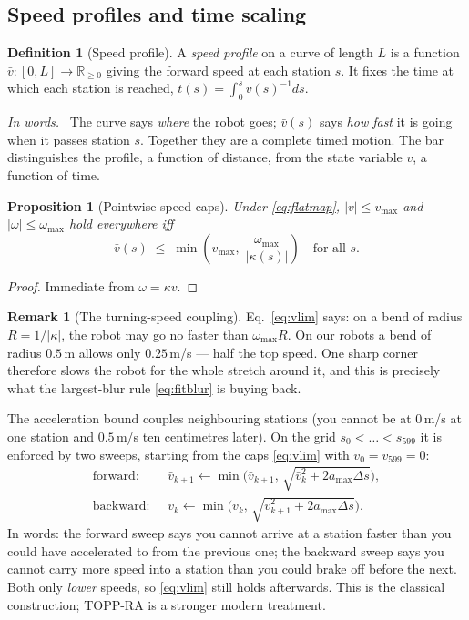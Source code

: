 \documentclass[conference]{IEEEtran}
\theoremstyle{plain}
\newtheorem{proposition}{Proposition}
\theoremstyle{definition}
\newtheorem{definition}{Definition}
\newtheorem{remark}{Remark}
\newcommand{\inwords}{\par\smallskip\noindent\textit{In words.}\ }
\newcommand{\R}{\mathbb{R}}
\begin{document}
\subsection{Speed profiles and time scaling}
\label{sec:prelim-topp}

\begin{definition}[Speed profile]
A \emph{speed profile} on a curve of length $L$ is a function $\bar v : [0,L] \to \R_{\ge 0}$
giving the forward speed at each station $s$. It fixes the time at which each station is
reached, $t(s) = \int_0^s \bar v(\bar s)^{-1} d\bar s$.
\inwords
The curve says \emph{where} the robot goes; $\bar v(s)$ says \emph{how fast} it is going when
it passes station $s$. Together they are a complete timed motion. The bar distinguishes the
profile, a function of distance, from the state variable $v$, a function of time.
\end{definition}

\begin{proposition}[Pointwise speed caps]
\label{prop:caps}
Under \eqref{eq:flatmap}, $|v| \le v_{\max}$ and $|\omega| \le \omega_{\max}$ hold everywhere
iff
\begin{equation}
  \bar v(s) \;\le\; \min\!\left( v_{\max},\; \frac{\omega_{\max}}{|\kappa(s)|} \right)
  \quad \text{for all } s .
  \label{eq:vlim}
\end{equation}
\end{proposition}

\begin{proof}
Immediate from $\omega = \kappa v$.
\end{proof}

\begin{remark}[The turning-speed coupling]
Eq.~\eqref{eq:vlim} says: on a bend of radius $R = 1/|\kappa|$, the robot may go no faster
than $\omega_{\max} R$. On our robots a bend of radius $0.5$\,m allows only $0.25$\,m/s ---
half the top speed. One sharp corner therefore slows the robot for the whole stretch around
it, and this is precisely what the largest-blur rule \eqref{eq:fitblur} is buying back.
\end{remark}

The acceleration bound couples neighbouring stations (you cannot be at $0$\,m/s at one
station and $0.5$\,m/s ten centimetres later). On the grid $s_0 < \dots < s_{599}$ it is
enforced by two sweeps, starting from the caps \eqref{eq:vlim} with $\bar v_0 = \bar v_{599} = 0$:
\begin{align}
  \text{forward: } \; & \bar v_{k+1} \leftarrow \min\!\big(\bar v_{k+1},\, \sqrt{\bar v_k^2 + 2 a_{\max}\Delta s}\big),
  \label{eq:fwd}\\
  \text{backward: } \; & \bar v_{k} \leftarrow \min\!\big(\bar v_{k},\, \sqrt{\bar v_{k+1}^2 + 2 a_{\max}\Delta s}\big).
  \label{eq:bwd}
\end{align}
In words: the forward sweep says you cannot arrive at a station faster than you could have
accelerated to from the previous one; the backward sweep says you cannot carry more speed
into a station than you could brake off before the next. Both only \emph{lower} speeds, so
\eqref{eq:vlim} still holds afterwards. This is the classical construction; TOPP-RA
\cite{toppra2018} is a stronger modern treatment.
\end{document}

